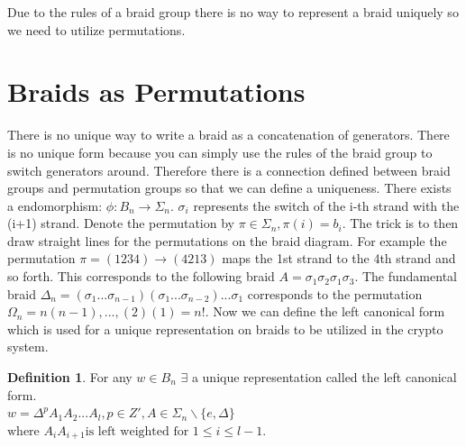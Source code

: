 \documentclass{article}
\theoremstyle{definition}
\newtheorem{definition}{Definition}[section]
\begin{document}
Due to the rules of a braid group there is no way to represent a braid uniquely so we need to utilize permutations.

\section{Braids as Permutations}
	There is no unique way to write a braid as a concatenation of generators. There is no unique form because you can simply use the rules of the braid group to switch generators around. Therefore there is a connection defined between braid groups and permutation groups so that we can define a uniqueness. There exists a endomorphism:
	$ \phi: B_n \rightarrow \Sigma_n$.
	$\sigma_i $ represents the switch of the i-th strand with the (i+1) strand. 
	Denote the permutation by $\pi \in \Sigma_n, \pi(i)=b_i$. The trick is to then draw straight lines for the permutations on the braid diagram. For example the permutation $\pi=(1 2 3 4)\rightarrow(4 2 1 3)$ maps the 1st strand to the 4th strand and so forth. This corresponds to the following braid $A=\sigma_1 \sigma_2 \sigma_1 \sigma_3$. The fundamental braid $\Delta_n=(\sigma_1...\sigma_{n-1})(\sigma_1 ... \sigma_{n-2})...\sigma_1 $ corresponds to the permutation $\Omega_n=n(n-1),...,(2)(1)=n!$. Now we can define the left canonical form which is used for a unique representation on braids to be utilized in the crypto system.
	
	\begin{definition}	
	For any $w \in B_n$ $\exists$ a unique representation called the left canonical form.
	\\$w = \Delta^p A_1 A_2 ... A_l, p \in Z', A \in \Sigma_n \backslash \{ e, \Delta \} $
	$\text{where } A_i A_{i+1} \text{is left weighted for } 1 \leq i \leq l - 1.$
	\end{definition}
	
\end{document}
